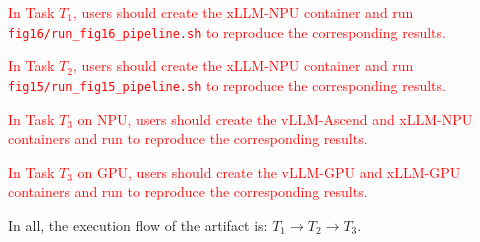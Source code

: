 \documentclass[nonacm,sigconf]{acmart}
\begin{document}
\textcolor{red}{In Task $T_1$, users should create the xLLM-NPU container and run \texttt{fig16/run\_fig16\_pipeline.sh} to reproduce the corresponding results.}

\textcolor{red}{In Task $T_2$, users should create the xLLM-NPU container and run \texttt{fig15/run\_fig15\_pipeline.sh} to reproduce the corresponding results.}

\textcolor{red}{In Task $T_3$ on NPU, users should create the vLLM-Ascend and xLLM-NPU containers and run  to reproduce the corresponding results.}

\textcolor{red}{In Task $T_3$ on GPU, users should create the vLLM-GPU and xLLM-GPU containers and run  to reproduce the corresponding results.}


In all, the execution flow of the artifact is: $T_1 \rightarrow T_2 \rightarrow T_3$.

%
%

\artout

\newartifact
\end{document}
